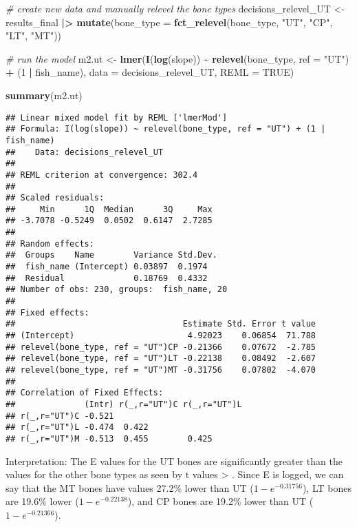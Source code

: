 \documentclass[
]{article}
\newenvironment{Shaded}{\begin{snugshade}}{\end{snugshade}}
\newcommand{\AttributeTok}[1]{\textcolor[rgb]{0.13,0.29,0.53}{#1}}
\newcommand{\CommentTok}[1]{\textcolor[rgb]{0.56,0.35,0.01}{\textit{#1}}}
\newcommand{\ConstantTok}[1]{\textcolor[rgb]{0.56,0.35,0.01}{#1}}
\newcommand{\DecValTok}[1]{\textcolor[rgb]{0.00,0.00,0.81}{#1}}
\newcommand{\FunctionTok}[1]{\textcolor[rgb]{0.13,0.29,0.53}{\textbf{#1}}}
\newcommand{\NormalTok}[1]{#1}
\newcommand{\OtherTok}[1]{\textcolor[rgb]{0.56,0.35,0.01}{#1}}
\newcommand{\SpecialCharTok}[1]{\textcolor[rgb]{0.81,0.36,0.00}{\textbf{#1}}}
\newcommand{\StringTok}[1]{\textcolor[rgb]{0.31,0.60,0.02}{#1}}
\begin{document}
\begin{Shaded}
\begin{Highlighting}[]
\CommentTok{\# create new data and manually relevel the bone types}
\NormalTok{decisions\_relevel\_UT }\OtherTok{\textless{}{-}}\NormalTok{ results\_final }\SpecialCharTok{|\textgreater{}}
   \FunctionTok{mutate}\NormalTok{(}\AttributeTok{bone\_type =} \FunctionTok{fct\_relevel}\NormalTok{(bone\_type, }\StringTok{"UT"}\NormalTok{, }\StringTok{"CP"}\NormalTok{, }\StringTok{"LT"}\NormalTok{, }\StringTok{"MT"}\NormalTok{))}

\CommentTok{\# run the model}
\NormalTok{m2.ut }\OtherTok{\textless{}{-}} \FunctionTok{lmer}\NormalTok{(}\FunctionTok{I}\NormalTok{(}\FunctionTok{log}\NormalTok{(slope)) }\SpecialCharTok{\textasciitilde{}}  \FunctionTok{relevel}\NormalTok{(bone\_type, }\AttributeTok{ref =} \StringTok{"UT"}\NormalTok{) }\SpecialCharTok{+}\NormalTok{ (}\DecValTok{1} \SpecialCharTok{|}\NormalTok{ fish\_name), }\AttributeTok{data =}\NormalTok{ decisions\_relevel\_UT, }\AttributeTok{REML =} \ConstantTok{TRUE}\NormalTok{)}

\FunctionTok{summary}\NormalTok{(m2.ut)}
\end{Highlighting}
\end{Shaded}

\begin{verbatim}
## Linear mixed model fit by REML ['lmerMod']
## Formula: I(log(slope)) ~ relevel(bone_type, ref = "UT") + (1 | fish_name)
##    Data: decisions_relevel_UT
## 
## REML criterion at convergence: 302.4
## 
## Scaled residuals: 
##     Min      1Q  Median      3Q     Max 
## -3.7078 -0.5249  0.0502  0.6147  2.7285 
## 
## Random effects:
##  Groups    Name        Variance Std.Dev.
##  fish_name (Intercept) 0.03897  0.1974  
##  Residual              0.18769  0.4332  
## Number of obs: 230, groups:  fish_name, 20
## 
## Fixed effects:
##                                  Estimate Std. Error t value
## (Intercept)                       4.92023    0.06854  71.788
## relevel(bone_type, ref = "UT")CP -0.21366    0.07672  -2.785
## relevel(bone_type, ref = "UT")LT -0.22138    0.08492  -2.607
## relevel(bone_type, ref = "UT")MT -0.31756    0.07802  -4.070
## 
## Correlation of Fixed Effects:
##              (Intr) r(_,r="UT")C r(_,r="UT")L
## r(_,r="UT")C -0.521                          
## r(_,r="UT")L -0.474  0.422                   
## r(_,r="UT")M -0.513  0.455        0.425
\end{verbatim}

Interpretation: The E values for the UT bones are significantly greater
than the values for the other bone types as seen by t values
\textgreater{} \textbar. Since E is logged, we can say that the
MT bones have values 27.2\% lower than UT (\(1-e^{-0.31756}\)), LT bones
are 19.6\% lower (\(1-e^{-0.22138}\)), and CP bones are 19.2\% lower
than UT (\(1 - e^{-0.21366}\)).
\end{document}
